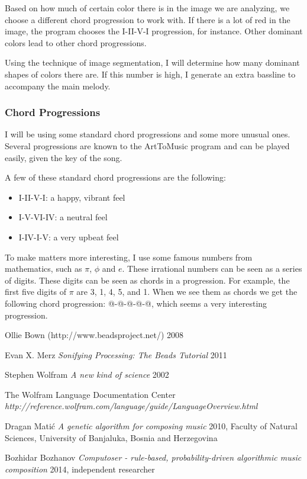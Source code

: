 \documentclass[12pt]{article}
\makeatletter
\newcommand*{\rom}[1]{\expandafter\@slowromancap\romannumeral #1@}
\makeatother
\begin{document}
Based on how much of certain color there is in the image we are analyzing, we choose a different chord progression to work with. If there is a lot of red in the image, the program chooses the I-II-V-I progression, for instance. Other dominant colors lead to other chord progressions.
\newline

Using the technique of image segmentation, I will determine how many dominant shapes of colors there are. If this number is high, I generate an extra bassline to accompany the main melody. 

\subsubsection{Chord Progressions}

I will be using some standard chord progressions and some more unusual ones. Several progressions are known to the ArtToMusic program and can be played easily, given the key of the song. 
‌\newline

A few of these standard chord progressions are the following:
\begin{itemize}
\item I-II-V-I: a happy, vibrant feel
\item I-V-VI-IV: a neutral feel
\item I-IV-I-V: a very upbeat feel
\end{itemize} 

To make matters more interesting, I use some famous numbers from mathematics, such as $\pi$, $\phi$ and $e$. These irrational numbers can be seen as a series of digits. These digits can be seen as chords in a progression. For example, the first five digits of $\pi$ are 3, 1, 4, 5, and 1. When we see them as chords we get the following chord progression: \rom{3}-\rom{1}-\rom{4}-\rom{5}-\rom{1}, which seems a very interesting progression.
\newpage

\begin{thebibliography}{1}

 Ollie Bown (http://www.beadsproject.net/) 2008

 Evan X. Merz {\em Sonifying Processing: The Beads Tutorial} 2011

 Stephen Wolfram {\em A new kind of science} 2002

 The Wolfram Language Documentation Center {\em http://reference.wolfram.com/language/guide/LanguageOverview.html}

 Dragan Mati\'c {\em A genetic algorithm for composing music} 2010, Faculty of Natural Sciences, University of Banjaluka, Bosnia and Herzegovina

 Bozhidar Bozhanov {\em Computoser - rule-based, probability-driven algorithmic music composition} 2014,  independent researcher

\end{thebibliography}
\end{document}
